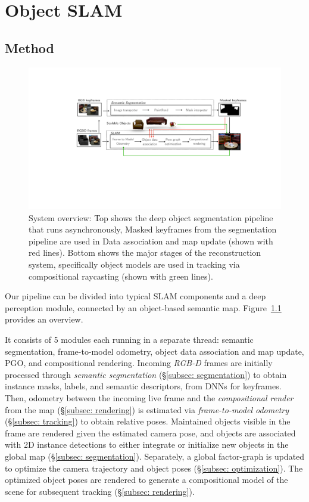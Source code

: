 \chapter{Object SLAM} \label{chap:object-slam}
\section{Method} \label{sec: methodology}
 \begin{figure}[ht!]
 	\centering
    \includegraphics[width=0.90\linewidth]{figs/icra2021-compressed.pdf}
    \caption{\label{fig:overview} System overview: Top shows the deep object segmentation pipeline that runs asynchronously, Masked keyframes from the segmentation pipeline are used in Data association and map update (shown with red lines). Bottom shows the major stages of the reconstruction system, specifically object models are used in tracking via compositional raycasting (shown with green lines).}
 \end{figure}

Our pipeline can be divided into typical SLAM components and a deep perception module, connected by an object-based semantic map. Figure~\ref{fig:overview} provides an overview.

%
It consists of 5 modules each running in a separate thread: semantic segmentation, frame-to-model odometry, object data association and map update, PGO, and compositional rendering.
%
Incoming \textit{RGB-D} frames are initially processed through  \textit{semantic segmentation} (\S\ref{subsec: segmentation})  to obtain instance masks, labels, and semantic descriptors, from DNNs for keyframes.
%
Then, odometry between the incoming live frame and the \textit{compositional render} from the map (\S\ref{subsec: rendering}) is estimated via \textit{frame-to-model odometry} (\S\ref{subsec: tracking}) to obtain relative poses.
%
Maintained objects visible in the frame are rendered given the estimated camera pose, and objects are associated with 2D instance detections to either integrate or initialize new objects in the global map (\S\ref{subsec: segmentation}).
%
Separately, a global factor-graph is updated to optimize the camera trajectory and object poses (\S\ref{subsec: optimization}). The optimized object poses are rendered to generate a compositional model of the scene for subsequent tracking (\S\ref{subsec: rendering}).

